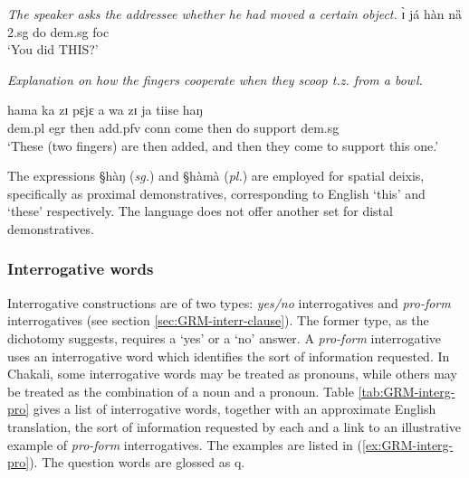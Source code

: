 \begin{exe}
\ex\label{ex:GRM-demons-pro-quest}{\it The speaker asks the addressee whether
he
had moved a certain object.} 
 \gll ɪ̀ já hàn nȁ\\
  {\sc 2.sg} do {\sc dem.sg}  {\sc foc}\\
 \glt `You did THIS?' 

\end{exe}


\begin{exe}
\ex\label{ex:GRM-demons-pro-quest}{\it Explanation on how the fingers cooperate
when they scoop t.z. from a bowl.}

 \gll hama ka zɪ pɛjɛ a wa zɪ ja tiise  haŋ\\
 {\sc dem.pl} {\sc egr} then add.{\sc pfv} {\sc conn} come then do support {\sc
dem.sg} \\
 
\glt `These (two fingers) are then added,
and then they come to support  this one.' 

\end{exe}



The expressions {\S hàŋ} ({\it sg.}) and {\S hàmà}
({\it pl.}) are employed for spatial deixis, specifically as proximal
demonstratives, corresponding to English `this' and `these' respectively. The
language does not offer another set for distal demonstratives.



\subsubsection{Interrogative words}
\label{sec:GRM-interg-pro}


Interrogative constructions are of two types:  {\it yes/no} interrogatives
and  {\it pro-form} interrogatives (see section
\ref{sec:GRM-interr-clause}). The former
type, as the dichotomy suggests, requires  
a `yes' or a `no' answer.  A {\it pro-form} interrogative  uses  an
interrogative word which identifies the sort of information requested. In
Chakali,  some interrogative words may be treated as pronouns, while others may
be treated as the combination of a noun and a pronoun.  Table
\ref{tab:GRM-interg-pro} gives a list of interrogative words, together with an
approximate English translation,  the sort of information requested by each  and
a link to an illustrative example of {\it pro-form} interrogatives. The examples
are listed in (\ref{ex:GRM-interg-pro}). The question words are glossed as  {\sc
q}.


